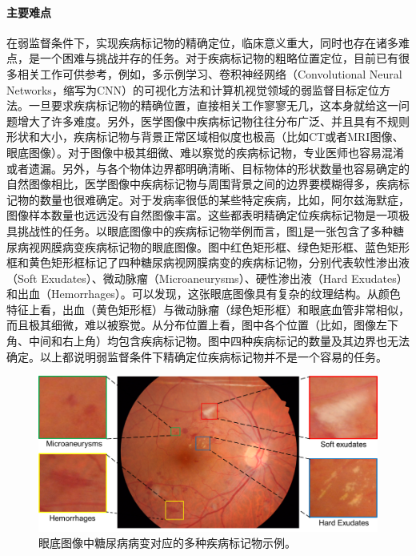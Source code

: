 \paragraph{主要难点} 在弱监督条件下，实现疾病标记物的精确定位，临床意义重大，同时也存在诸多难点，是一个困难与挑战并存的任务。对于疾病标记物的粗略位置定位，目前已有很多相关工作可供参考，例如，多示例学习、卷积神经网络（Convolutional Neural Networks，缩写为CNN）的可视化方法和计算机视觉领域的弱监督目标定位方法。一旦要求疾病标记物的精确位置，直接相关工作寥寥无几，这本身就给这一问题增大了许多难度。另外，医学图像中疾病标记物往往分布广泛、并且具有不规则形状和大小，疾病标记物与背景正常区域相似度也极高（比如CT或者MRI图像、眼底图像）。对于图像中极其细微、难以察觉的疾病标记物，专业医师也容易混淆或者遗漏。另外，与各个物体边界都明确清晰、目标物体的形状数量也容易确定的自然图像相比，医学图像中疾病标记物与周围背景之间的边界要模糊得多，疾病标记物的数量也很难确定。对于发病率很低的某些特定疾病，比如，阿尔兹海默症，图像样本数量也远远没有自然图像丰富。这些都表明精确定位疾病标记物是一项极具挑战性的任务。以眼底图像中的疾病标记物举例而言，图\ref{fig:biomarker_localization_example}是一张包含了多种糖尿病视网膜病变疾病标记物的眼底图像。图中红色矩形框、绿色矩形框、蓝色矩形框和黄色矩形框标记了四种糖尿病视网膜病变的疾病标记物，分别代表软性渗出液（Soft Exudates）、微动脉瘤（Microaneurysms）、硬性渗出液（Hard Exudates）和出血（Hemorrhages）。可以发现，这张眼底图像具有复杂的纹理结构。从颜色特征上看，出血（黄色矩形框）与微动脉瘤（绿色矩形框）和眼底血管非常相似，而且极其细微，难以被察觉。从分布位置上看，图中各个位置（比如，图像左下角、中间和右上角）均包含疾病标记物。图中四种疾病标记的数量及其边界也无法确定。以上都说明弱监督条件下精确定位疾病标记物并不是一个容易的任务。
\begin{figure}[h]
	\centering
	\includegraphics[width=1.0\textwidth]{figure/biomarker_localization_example}
	\caption[眼底图像中糖尿病病变对应的多种疾病标记物示例]{眼底图像中糖尿病病变对应的多种疾病标记物示例。} 
	\label{fig:biomarker_localization_example}
\end{figure}

